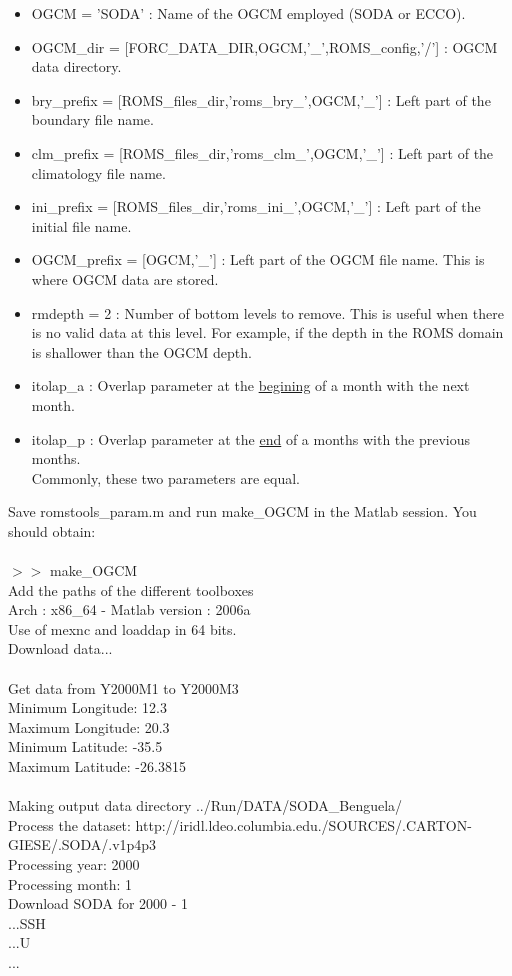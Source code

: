 \begin{itemize}
\item OGCM = 'SODA' : Name of the OGCM employed (SODA or ECCO).
\item OGCM\_dir    = [FORC\_DATA\_DIR,OGCM,'\_',ROMS\_config,'/']  : 
OGCM data directory.
\item bry\_prefix  = [ROMS\_files\_dir,'roms\_bry\_',OGCM,'\_'] : 
Left part of the boundary file name.
\item clm\_prefix  = [ROMS\_files\_dir,'roms\_clm\_',OGCM,'\_'] : 
Left part of the climatology file name.
\item ini\_prefix  = [ROMS\_files\_dir,'roms\_ini\_',OGCM,'\_'] : 
Left part of the initial file name.
\item OGCM\_prefix = [OGCM,'\_'] : 
Left part of the OGCM file name. This is where OGCM data are
stored. 
\item rmdepth = 2 : Number of bottom levels to remove.
This is useful when there is no valid data at this level.
For example, if the depth in the ROMS domain is shallower 
than the OGCM depth.
\item itolap\_a : Overlap parameter at the \underline{begining} of a month with the
  next month. 
\item itolap\_p : Overlap parameter at the \underline{end} of a months with the
  previous months.\\
Commonly, these two parameters are equal. 
\end{itemize}
Save romstools\_param.m and run make\_OGCM in the Matlab session.
You should obtain:
\\\\
$>>$ make\_OGCM\\
Add the paths of the different toolboxes\\
Arch : x86\_64 - Matlab version : 2006a\\
Use of mexnc and loaddap in 64 bits.\\
Download data...\\
\\
Get data from Y2000M1 to Y2000M3\\
Minimum Longitude: 12.3\\
Maximum Longitude: 20.3\\
Minimum Latitude: -35.5\\
Maximum Latitude: -26.3815\\
\\
Making output data directory ../Run/DATA/SODA\_Benguela/\\
Process the dataset: http://iridl.ldeo.columbia.edu./SOURCES/.CARTON-GIESE/.SODA/.v1p4p3\\
Processing year: 2000\\
  Processing month: 1\\
    Download SODA for 2000 - 1\\
    ...SSH\\
    ...U\\
...

